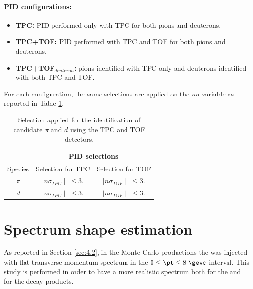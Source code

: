 \paragraph{PID configurations:}
\begin{itemize}
\item \textbf{TPC:} PID performed only with TPC for both pions and deuterons.
\item \textbf{TPC+TOF:} PID performed with TPC and TOF for both pions and deuterons.
\item \textbf{TPC+TOF$_{deuteron}$:} pions identified with TPC only and deuterons
identified with both TPC and TOF.
\end{itemize}

For each configuration, the same selections are applied on the $n\sigma$ variable as reported in
Table \ref{tab:pid_config}.

\begingroup
\renewcommand{\arraystretch}{1.5} %
\begin{table}
\centering
\begin{tabular}{ccc}
    & \multicolumn{2}{c}{\textbf{PID selections}}  \\%
\toprule
Species & Selection for TPC & Selection for TOF   \\
\hline
$\pi$ & $\mid n \sigma_{TPC}\mid\; \leq 3.$  & $\mid n \sigma_{TOF}\mid\; \leq 3.$ \\

$d$   & $\mid n \sigma_{TPC}\mid\; \leq 3.$  & $\mid n \sigma_{TOF}\mid\; \leq 3.$ \\
\midrule
\end{tabular}
\caption{Selection applied for the identification of candidate $\pi$ and $d$ using the TPC and TOF detectors.}
\label{tab:pid_config}
\end{table}
\endgroup

%
%
\section{Spectrum shape estimation} \label{sec:spectrum}

As reported in Section \ref{sec:4.2}, in the Monte Carlo productions the \dst was injected with flat
transverse momentum spectrum in the $0 \leq \pt \leq 8\;\gevc$ interval. 
This study is performed in order to have a more realistic spectrum both for the \ds and for the decay 
products.

